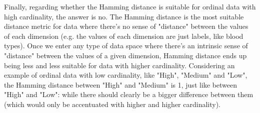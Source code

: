 \documentclass[12pt]{article}
\begin{document}
Finally, regarding whether the Hamming distance is suitable for ordinal data with
high cardinality, the answer is no. The Hamming distance is the most suitable
distance metric for data where there's no sense of "distance" between the values
of each dimension (e.g. the values of each dimension are just labels, like blood types).
Once we enter any type of data space where there's an intrinsic sense of "distance" between
the values of a given dimension, Hamming distance ends up being less and less suitable
for data with higher cardinality. Considering an example of ordinal data with low
cardinality, like "High", "Medium" and "Low", the Hamming distance between "High" and
"Medium" is 1, just like between "High" and "Low": while there should clearly be
a bigger difference between them (which would only be accentuated with higher and higher cardinality).
\end{document}
